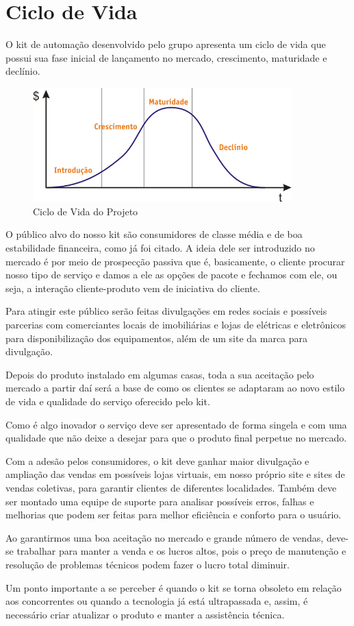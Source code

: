 \chapter{Ciclo de Vida}
\par O kit de automação desenvolvido pelo grupo apresenta um ciclo de vida que possui sua fase inicial de lançamento no mercado, crescimento, maturidade e declínio.

\begin{figure}[!h]
\caption{Ciclo de Vida do Projeto}
\centering
\includegraphics[width=10cm]{figuras/ciclodevida}
\end{figure}

\par O público alvo do nosso kit são consumidores de classe média e de boa estabilidade financeira, como já foi citado. A ideia dele ser introduzido no mercado é por meio de prospecção passiva que é, basicamente, o cliente procurar nosso tipo de serviço e damos a ele as opções de pacote e fechamos com ele, ou seja, a interação cliente-produto vem de iniciativa do cliente.
\par Para atingir este público serão feitas divulgações em redes sociais e possíveis parcerias com comerciantes locais de imobiliárias e lojas de elétricas e eletrônicos para disponibilização dos equipamentos, além de um site da marca para divulgação.
\par Depois do produto instalado em algumas casas, toda a sua aceitação pelo mercado a partir daí será a base de como os clientes se adaptaram ao novo estilo de vida e qualidade do serviço oferecido pelo kit.
\par Como é algo inovador o serviço deve ser apresentado de forma singela e com uma qualidade que não deixe a desejar para que o produto final perpetue no mercado.
\par Com a adesão pelos consumidores, o kit deve ganhar maior divulgação e ampliação das vendas em possíveis lojas virtuais, em nosso próprio site e sites de vendas coletivas, para garantir clientes de diferentes localidades. Também deve ser montado uma equipe de suporte para analisar possíveis erros, falhas e melhorias que podem ser feitas para melhor eficiência e conforto para o usuário.
\par Ao garantirmos uma boa aceitação no mercado e grande número de vendas, deve-se trabalhar para manter a venda e os lucros altos, pois o preço de manutenção e resolução de problemas técnicos podem fazer o lucro total diminuir.
\par Um ponto importante a se perceber é quando o kit se torna obsoleto em relação aos concorrentes ou quando a tecnologia já está ultrapassada e, assim, é necessário criar atualizar o produto e manter a assistência técnica.

